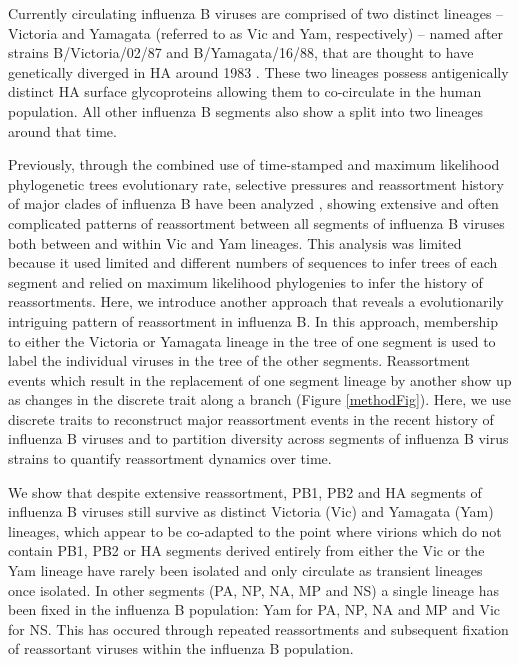 \documentclass[11pt,oneside,letterpaper]{article}
\begin{document}
Currently circulating influenza B viruses are comprised of two distinct lineages -- Victoria and Yamagata (referred to as Vic and Yam, respectively) -- named after strains B/Victoria/02/87 and B/Yamagata/16/88, that are thought to have genetically diverged in HA around 1983 \cite{rota1990}. 
These two lineages possess antigenically distinct HA surface glycoproteins allowing them to co-circulate in the human population.
All other influenza B segments also show a split into two lineages around that time.

Previously, through the combined use of time-stamped and maximum likelihood phylogenetic trees evolutionary rate, selective pressures and reassortment history of major clades of influenza B have been analyzed \cite{chen2008}, showing extensive and often complicated patterns of reassortment between all segments of influenza B viruses both between and within Vic and Yam lineages.
This analysis was limited because it used limited and different numbers of sequences to infer trees of each segment and relied on maximum likelihood phylogenies to infer the history of reassortments.
Here, we introduce another approach that reveals a evolutionarily intriguing pattern of reassortment in influenza B.
In this approach, membership to either the Victoria or Yamagata lineage in the tree of one segment is used to label the individual viruses in the tree of the other segments.
Reassortment events which result in the replacement of one segment lineage by another show up as changes in the discrete trait along a branch (Figure \ref{methodFig}).
Here, we use discrete traits to reconstruct major reassortment events in the recent history of influenza B viruses and to partition diversity across segments of influenza B virus strains to quantify reassortment dynamics over time.

We show that despite extensive reassortment, PB1, PB2 and HA segments of influenza B viruses still survive as distinct Victoria (Vic) and Yamagata (Yam) lineages, which appear to be co-adapted to the point where virions which do not contain PB1, PB2 or HA segments derived entirely from either the Vic or the Yam lineage have rarely been isolated and only circulate as transient lineages once isolated.
In other segments (PA, NP, NA, MP and NS) a single lineage has been fixed in the influenza B population: Yam for PA, NP, NA and MP and Vic for NS.
This has occured through repeated reassortments and subsequent fixation of reassortant viruses within the influenza B population.
\end{document}
